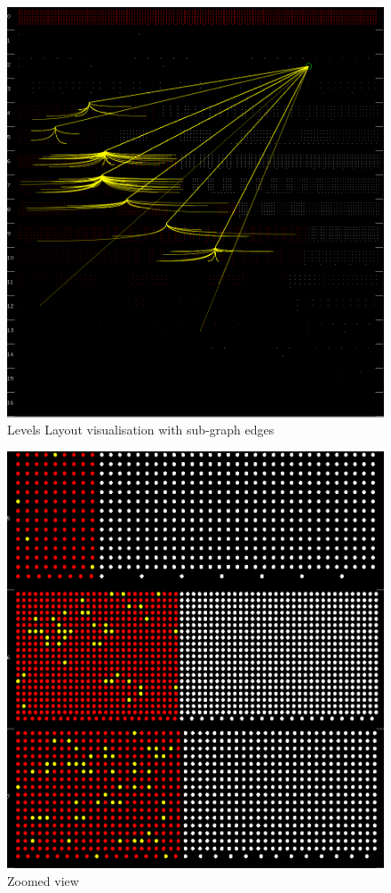 \begin{figure}[h!]
\centering
\includegraphics[scale=0.35]{pictures/go_levels_layout_selected.png}
\caption{Levels Layout visualisation with sub-graph edges}
\label{fig:go_levels_layout_selected}
\end{figure}

\begin{figure}[h!]
\centering
\includegraphics[scale=0.35]{pictures/go_zoom.png}
\caption{Zoomed view}
\label{fig:go_zoom}
\end{figure}

